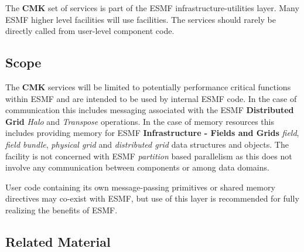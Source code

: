 The {\bf CMK} set of services is part of the ESMF infrastructure-utilities 
layer. Many ESMF higher level facilities will use {\bf \shortname} facilities.
The {\bf \shortname} services should rarely be directly called from user-level
component code.


\subsection{Scope}

The {\bf CMK} services will be limited to potentially performance
critical functions within ESMF and are intended to be used by internal
ESMF code. In the case of communication this includes messaging
associated with the ESMF {\bf Distributed Grid} {\it Halo} and {\it
  Transpose} operations. In the case of memory resources this includes
providing memory for ESMF {\bf Infrastructure - Fields and Grids} {\it
  field}, {\it field bundle}, {\it physical grid} and {\it distributed
  grid} data structures and objects.  The {\bf \shortname} facility is
not concerned with ESMF {\it partition} based parallelism as this does
not involve any communication between components or among data
domains.

User code containing its own message-passing primitives or shared
memory directives may co-exist with ESMF, but use of this layer
is recommended for fully realizing the benefits of ESMF.

\subsection{Related Material}

